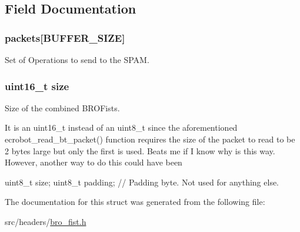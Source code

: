 \subsection{Field Documentation}
\hypertarget{structbro__spam__fists__t_a5cccc799a79e4430d894573577992c2d}{
\subsubsection[{packets}]{ {\bf packets}\mbox{[}BUFFER\_\-SIZE\mbox{]}}}
\label{structbro__spam__fists__t_a5cccc799a79e4430d894573577992c2d}


Set of Operations to send to the SPAM. 

\hypertarget{structbro__spam__fists__t_aaba88b24a21a6c70c895c0d55f4a69a0}{
\subsubsection[{size}]{\setlength{\rightskip}{0pt plus 5cm}uint16\_\-t {\bf size}}}
\label{structbro__spam__fists__t_aaba88b24a21a6c70c895c0d55f4a69a0}


Size of the combined BROFists. 

It is an uint16\_\-t instead of an uint8\_\-t since the aforementioned ecrobot\_\-read\_\-bt\_\-packet() function requires the size of the packet to read to be 2 bytes large but only the first is used. Beats me if I know why is this way. However, another way to do this could have been \begin{DoxyVerb}
uint8_t size;
uint8_t padding; // Padding byte. Not used for anything else.
\end{DoxyVerb}
 

The documentation for this struct was generated from the following file:\begin{DoxyCompactItemize}
\item 
src/headers/\hyperlink{bro__fist_8h}{bro\_\-fist.h}\end{DoxyCompactItemize}
